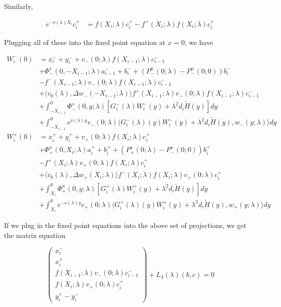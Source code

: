 \documentclass[12pt]{article}
\begin{document}
\begin{enumerate}
Similarly,

\begin{align*}
e^{-\nu(\lambda)X_i} c_i^+ &= f(X_i; \lambda) c_i^+ - f^+(X_i; \lambda)f(X_i; \lambda) c_i^+
\end{align*}

Plugging all of these into the fixed point equation at $x = 0$, we have

\begin{align*}
W_i^-(0) &= x_i^- + y_i^- + v_-(0; \lambda) f(X_{i-1}; \lambda) c_{i-1}^-  \\
&+\Phi^s_-(0, -X_{i-1}; \lambda)a_{i-1}^- + b_i^- + (P^u_-(0; \lambda) - P^u_-(0; 0))b_i^- \\
&- f^-(X_{i-1}; \lambda) v_-(0; \lambda) f(X_{i-1}; \lambda) c_{i-1}^- \\
&+ \langle v_0(\lambda), \Delta w_-(-X_{i-1}; \lambda) \rangle 
f^+(X_{i-1}; \lambda) v_-(0; \lambda) f(X_{i-1}; \lambda) c_{i-1}^- \\
&+ \int_{-X_{i-1}}^0 \Phi^s_-(0, y; \lambda) [ G_i^-(\lambda)W_i^-(y) + \lambda^2 d_i \tilde{H}(y) ] dy \\
&+ \int_{-X_{i-1}}^0
e^{\nu(\lambda)y} v_-(0; \lambda) \langle G_i^-(\lambda)(y)W_i^-(y) + \lambda^2 d_i \tilde{H}(y), w_-(y; \lambda) \rangle dy \\
W_i^+(0) &= x_i^+ + y_i^+ + v_+(0; \lambda) f(X_i; \lambda) c_i^+ \\
&+\Phi^u_+(0, X_i; \lambda)a_i^+ + b_i^+ + (P^s_+(0; \lambda) - P^s_-(0; 0))b_i^+ \\
&- f^+(X_i; \lambda) v_+(0; \lambda) f(X_i; \lambda) c_i^+ \\
&+ \langle v_0(\lambda), \Delta w_+(X_i; \lambda) \rangle 
f^-(X_i; \lambda)f(X_i; \lambda) v_+(0; \lambda) c_i^+ \\
&+ \int_{X_i}^0 \Phi^u_+(0, y; \lambda) [ G_i^+(\lambda)W_i^+(y) + \lambda^2 d_i \tilde{H}(y) ] dy \\
&+ \int_{X_i}^0 e^{-\nu(\lambda)y} v_+(0; \lambda) \langle G_i^+(\lambda)(y)W_i^+(y) + \lambda^2 d_i \tilde{H}(y), w_+(y; \lambda) \rangle dy
\end{align*}

If we plug in the fixed point equations into the above set of projections, we get the matrix equation

\[
\begin{pmatrix}x_i^- \\ x_i^+ \\ 
f(X_{i-1}; \lambda) v_-(0; \lambda) c_{i-1}^- \\
f(X_i; \lambda) v_+(0; \lambda) c_i^+ \\
y_i^+ - y_i^- \end{pmatrix} + L_4(\lambda)(b, c) = 0
\]



\end{enumerate}
\end{document}
